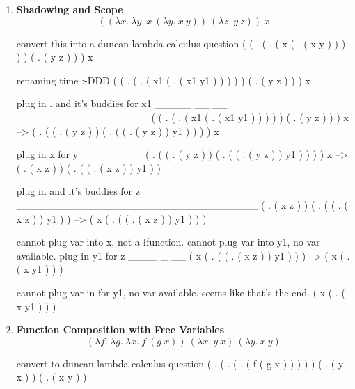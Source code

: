 \documentclass[11pt]{article}
\begin{document}
\begin{enumerate}
        \newpage

        \item \textbf{Shadowing and Scope}
        \[
            ((\lambda x.\ \lambda y.\ x\ (\lambda y.\ x\ y))\ (\lambda z.\ y\ z))\ x
        \]

        \begin{markdown}
            convert this into a duncan lambda calculus question
            ( ( \lx. ( \ly. ( x ( \ly. ( x y ) ) ) ) ) ( \lz. ( y z ) ) ) x

            \a renaming time :-DDD
            ( ( . ( \ly. ( x1 ( . ( x1 y1 ) ) ) ) ) ( \lz. ( y z ) ) ) x

            plug in \lz. and it's buddies for x1
            _____          __           __              __________________
            ( ( . ( \ly. ( x1 ( . ( x1 y1 ) ) ) ) ) ( \lz. ( y z ) ) ) x
            -->
            ( \ly. ( ( \lz. ( y z ) ) ( . ( ( \lz. ( y z ) ) y1 ) ) ) ) x

            plug in x for y
            ____            _                          _                  _
            ( \ly. ( ( \lz. ( y z ) ) ( . ( ( \lz. ( y z ) ) y1 ) ) ) ) x
            -->
            ( \lz. ( x z ) ) ( . ( ( \lz. ( x z ) ) y1 ) )

            plug in  and it's buddies for z
            ____     _     _________________________________
            ( \lz. ( x z ) ) ( . ( ( \lz. ( x z ) ) y1 ) )
            -->
            ( x ( . ( ( \lz. ( x z ) ) y1 ) ) )

            cannot plug var into x, not a \l function.
            cannot plug var into y1, no var available.
            plug in y1 for z
            ____     _     __
            ( x ( . ( ( \lz. ( x z ) ) y1 ) ) )
            -->
            ( x ( . ( x y1 ) ) )

            cannot plug var in for y1, no var available.
            seems like that's the end.
            ( x ( . ( x y1 ) ) )
        \end{markdown}

        \newpage

        \vspace{1in}

        \item \textbf{Function Composition with Free Variables}
        \[
            (\lambda f.\ \lambda g.\ \lambda x.\ f\ (g\ x))\ (\lambda x.\ y\ x)\ (\lambda y.\ x\ y)
        \]

        \begin{markdown}
            convert to duncan lambda calculus question
            ( \lf. ( \lg. ( \lx. ( f ( g x ) ) ) ) ) ( \lx. ( y x ) ) ( \ly. ( x y ) )


\end{markdown}
\end{enumerate}
\end{document}
